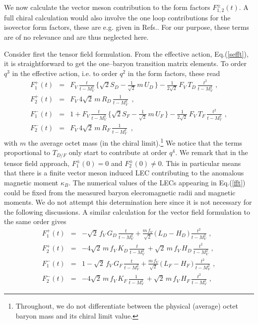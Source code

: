 We now calculate the vector meson contribution to the form factors
$F_{1,2}^\pm (t)$. A full chiral calculation would also involve the
one loop contributions for the isovector form factors, these are e.g.
given in Refs.\cite{gss,bkkm}. For our purpose, these terms are of no
relevance and are thus neglected here.

Consider first the tensor field formulation. From the effective
action, Eq.(\ref{sefft}), it is straightforward to get the one--baryon
transition matrix elements. To order $q^3$ in the effective action,
i.e. to order $q^2$ in the form factors, these read
\begin{eqnarray}
F_1^+ (t) &=& F_V \, \frac{t}{t-M_V^2} \, \biggl\{ \sqrt{2} S_D -
\frac{1}{\sqrt{2}} \, m \, U_D \, \biggr\}
- \frac{1}{2\sqrt{2}} \, F_V \, T_D \, \frac{t^2}{t-M_V^2}
\, \, , \nonumber \\
F_2^+ (t) &=& F_V \, 4 \sqrt{2} \, m \, R_D \, \frac{1}{t-M_V^2} \,
 \, \, , \nonumber \\
F_1^- (t) &=& 1 + F_V \, \frac{t}{t-M_V^2} \, \biggl\{ \sqrt{2} S_F -
\frac{1}{\sqrt{2}} \, m \, U_F \, \biggr\}
- \frac{1}{2\sqrt{2}} \, F_V \, T_F \, \frac{t^2}{t-M_V^2}
\, \, , \nonumber \\
F_2^- (t) &=& F_V \, 4 \sqrt{2} \, m \, R_F \, \frac{1}{t-M_V^2} \,
 \, \, ,
\label{fft}
\end{eqnarray}
with $m$ the average octet mass (in the chiral
limit).\footnote{Throughout, we do not differentiate between the
physical (average) octet baryon mass and its
chiral limit value.}  We notice that
the terms proportional to $T_{D/F}$ only start to contribute at order
$q^4$. We remark that in the tensor field approach, $F_1^\pm (0) =0$
and $F_2^\pm (0) \neq 0$. This in particular means that there is a
finite vector meson induced LEC
contributing to the anomalous magnetic moment $\kappa_B$.
The numerical values of the LECs appearing in Eq.(\ref{fft}) could be
fixed from the measured baryon elecromagnetic radii and magnetic
moments. We do not attempt this determination here since it is not
necessary for the following discussions.
A similar calculation for the vector field formulation to the same
order gives
\begin{eqnarray}
F_1^+ (t) &=& - \sqrt{2} \, f_V \, G_D \, \frac{t}{t-M_V^2}
+ \frac{m \, f_V}{\sqrt{2}} \, \biggl( \, L_D
-   H_D \, \biggr) \, \frac{t^2}{t-M_V^2}
\, \, , \nonumber \\
F_2^+ (t) &=& - 4 \sqrt{2} \, m \, f_V \, K_D \, \frac{t}{t-M_V^2} \,
+ \sqrt{2} \, m  \, f_V \, H_D \, \frac{t^2}{t-M_V^2}
 \, \, , \nonumber \\
F_1^- (t) &=& 1 - \sqrt{2}\, f_V \, G_F \, \frac{t}{t-M_V^2}
+ \frac{m \, f_V}{\sqrt{2}} \, \biggl( \, L_F
-  H_F \, \biggr) \,  \frac{t^2}{t-M_V^2}
\, \, , \nonumber \\
F_2^- (t) &=& - 4 \sqrt{2} \, m \, f_V \, K_F \, \frac{1}{t-M_V^2} \,
+ \sqrt{2} \, m  \, f_V \, H_F \, \frac{t^2}{t-M_V^2}
 \, \, ,
\label{ffv}
\end{eqnarray}
